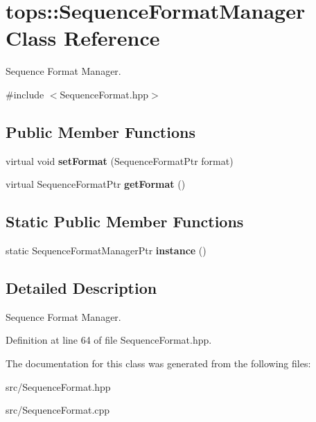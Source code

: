 \hypertarget{classtops_1_1SequenceFormatManager}{}\section{tops\+:\+:Sequence\+Format\+Manager Class Reference}
\label{classtops_1_1SequenceFormatManager}


Sequence Format Manager.  




{\ttfamily \#include $<$Sequence\+Format.\+hpp$>$}

\subsection*{Public Member Functions}
\begin{DoxyCompactItemize}
\item 
\mbox{\label{classtops_1_1SequenceFormatManager_a57349a24a52538a8ccc2a912e9c4e071}} 
virtual void {\bfseries set\+Format} (Sequence\+Format\+Ptr format)
\item 
\mbox{\label{classtops_1_1SequenceFormatManager_a89e37f020c2744c7fe3c2f8a9e7336af}} 
virtual Sequence\+Format\+Ptr {\bfseries get\+Format} ()
\end{DoxyCompactItemize}
\subsection*{Static Public Member Functions}
\begin{DoxyCompactItemize}
\item 
\mbox{\label{classtops_1_1SequenceFormatManager_a0f46da7a02564ac50768e6000df0fc41}} 
static Sequence\+Format\+Manager\+Ptr {\bfseries instance} ()
\end{DoxyCompactItemize}


\subsection{Detailed Description}
Sequence Format Manager. 

Definition at line 64 of file Sequence\+Format.\+hpp.



The documentation for this class was generated from the following files\+:\begin{DoxyCompactItemize}
\item 
src/Sequence\+Format.\+hpp\item 
src/Sequence\+Format.\+cpp\end{DoxyCompactItemize}
